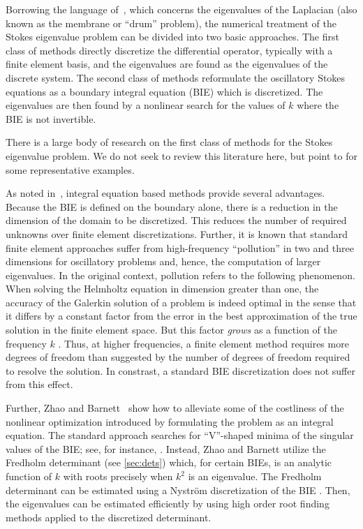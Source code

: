 Borrowing the language of~\cite{zhao2015robust},
which concerns the eigenvalues of the Laplacian
(also known as the membrane or ``drum'' problem),
the numerical treatment of the Stokes eigenvalue
problem can be divided into two basic approaches.
%
The first class of methods
directly discretize the
differential operator, typically with a
finite element basis, and the eigenvalues are found
as the eigenvalues of the discrete system.
%
The second class of methods reformulate the 
oscillatory Stokes equations as a boundary integral
equation (BIE) which is discretized.
The eigenvalues are then found
by a nonlinear search for the values of
$k$ where the BIE is not invertible.
%

There is a large body of research on the first class of methods
for the Stokes eigenvalue problem.
%
We do not seek to review this literature here,
but point to \cite{johnson1974beam,rannacher1979nonconforming,mercier1981eigenvalue,bjorstad1999high,jia2009approximation,chen2006approximation,lovadina2009posteriori,huang2011numerical,carstensen2014guaranteed}
for some representative examples.

As noted in~\cite{zhao2015robust}, integral
equation based methods provide several advantages.
%
Because the BIE is defined on the
boundary alone, there is a reduction in the
dimension of the domain to be discretized.
%
{\color{red}This reduces the number of required unknowns over finite
element discretizations. Further, it is known
that standard finite element approaches suffer from
high-frequency ``pollution'' in two and three dimensions
for oscillatory problems and, hence, the computation
of larger eigenvalues. In the original context,
pollution refers to the following phenomenon.
When solving the Helmholtz equation in dimension
greater than one,
the accuracy of the Galerkin solution of
a problem is indeed optimal in the sense that it
differs by a constant factor from
the error in the best approximation of the true
solution in the finite element space.
But this factor
{\it grows} as a function of the frequency $k$
\cite{babuska1997pollution}.
Thus, at higher frequencies, a finite element method
requires more degrees of freedom than suggested
by the number of degrees of freedom required to
resolve the solution.
In constrast, a standard BIE discretization does not
suffer from this effect.}

Further, Zhao and Barnett~\cite{zhao2015robust}
show how to alleviate some of the costliness of the
nonlinear optimization introduced by formulating the 
problem as an integral equation.
%
The standard approach searches for ``V''-shaped minima
of the singular values of the BIE; see, for
instance, \cite{trefethen2006computed}.
%
Instead, Zhao and Barnett utilize the Fredholm
determinant (see \cref{sec:dets}) which, for certain
BIEs, is an analytic function of $k$ with roots
precisely when $k^2$ is an eigenvalue.
%
The Fredholm determinant can be estimated using
a Nystr\"{o}m discretization of the BIE
\cite{bornemann2010numerical,zhao2015robust}.
%
Then, the eigenvalues can be estimated efficiently
by using high order root finding methods applied
to the discretized determinant.

